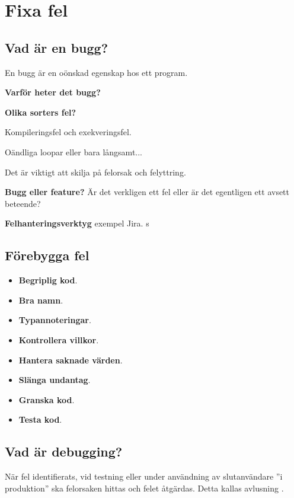 
\chapter{Fixa fel}\label{appendix:debug}



\section{Vad är en bugg?}

En bugg är en oönskad egenskap hos ett program. 

\textbf{Varför heter det bugg?}


\textbf{Olika sorters fel?}

Kompileringsfel och exekveringsfel. 

Oändliga loopar eller bara långsamt... 

Det är viktigt att skilja på felorsak och felyttring.

\textbf{Bugg eller feature?} Är det verkligen ett fel eller är det egentligen ett avsett beteende?

\textbf{Felhanteringsverktyg} exempel Jira.
s
\section{Förebygga fel}

\begin{itemize}
\item \textbf{Begriplig kod}.
\item \textbf{Bra namn}.
\item \textbf{Typannoteringar}.
\item \textbf{Kontrollera villkor}.
\item \textbf{Hantera saknade värden}.
\item \textbf{Slänga undantag}.
\item \textbf{Granska kod}.
\item \textbf{Testa kod}.
\end{itemize}


\section{Vad är debugging?}

När fel identifierats, vid testning eller under användning av slutanvändare ''i produktion'' ska felorsaken hittas och felet åtgärdas. Detta kallas avlusning .

